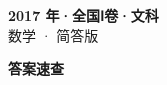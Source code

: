 \documentclass[zihao=-4, a4paper]{ctexart}
\begin{document}
\begin{center}
  {\Large\bfseries 2017 年·全国Ⅰ卷·文科}\\[4pt]
  {\large 数学 · 简答版}
\end{center}
\medskip
{}

\clearpage
{}
\begin{center}{\Large\bfseries 答案速查}\end{center}
\medskip

\end{document}
